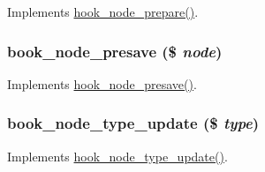 \label{book_8module_a8a8ea6d87c29a8bf3e88ade3f1df6551}
Implements \hyperlink{group__node__api__hooks_ga4bbe7320bd52fc6183920c8be2d9d4f6}{hook\_\-node\_\-prepare()}. \hypertarget{book_8module_a3d41122daff1649b12fe2d099aa34711}{
\subsubsection[{book\_\-node\_\-presave}]{\setlength{\rightskip}{0pt plus 5cm}book\_\-node\_\-presave (\$ {\em node})}}
\label{book_8module_a3d41122daff1649b12fe2d099aa34711}
Implements \hyperlink{group__node__api__hooks_gab339b1a1ce0e235d4a9c5a05e410dcd6}{hook\_\-node\_\-presave()}. \hypertarget{book_8module_a0bd6c2cb484f03c2c190aefd4f550ef7}{
\subsubsection[{book\_\-node\_\-type\_\-update}]{\setlength{\rightskip}{0pt plus 5cm}book\_\-node\_\-type\_\-update (\$ {\em type})}}
\label{book_8module_a0bd6c2cb484f03c2c190aefd4f550ef7}
Implements \hyperlink{group__hooks_ga7518f336bfbd131259f520fcd45ba710}{hook\_\-node\_\-type\_\-update()}.

